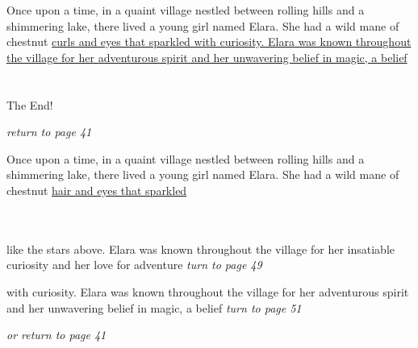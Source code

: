 \documentclass{memoir}
\begin{document}
        


        \hspace{1cm}\vfill
        \begin{minipage}{3in}
        \LARGE
        Once upon a time, in a quaint village nestled between rolling hills and a shimmering lake, there lived a young girl named Elara. She had a wild mane of chestnut \ul{curls and eyes that sparkled with curiosity. Elara was known throughout the village for her adventurous spirit and her unwavering belief in magic, a belief}\\ \vspace{5mm} \\
 \\\vspace{1cm} The End! \\ 

        \hspace{1cm}\begin{minipage}{6cm}
        \normalsize
            \hfill \textit{return to page 41}
        \end{minipage} 
        \end{minipage}
        \hspace{1cm}\vfill
        \cleardoublepage

        


        \hspace{1cm}\vfill
        \begin{minipage}{3in}
        \LARGE
        Once upon a time, in a quaint village nestled between rolling hills and a shimmering lake, there lived a young girl named Elara. She had a wild mane of chestnut \ul{hair and eyes that sparkled}\\ \vspace{5mm} \\
  \\ 

        \hspace{1cm}\begin{minipage}{6cm}
        \normalsize
            like the stars above. Elara was known throughout the village for her insatiable curiosity and her love for adventure \hfill \textit{turn to page 49}\\ \vspace{5mm}

with curiosity. Elara was known throughout the village for her adventurous spirit and her unwavering belief in magic, a belief \hfill \textit{turn to page 51}\\ \vspace{5mm}

\hfill \textit{or return to page 41}
        \end{minipage} 
        \end{minipage}
        \hspace{1cm}\vfill
        \cleardoublepage
\end{document}
